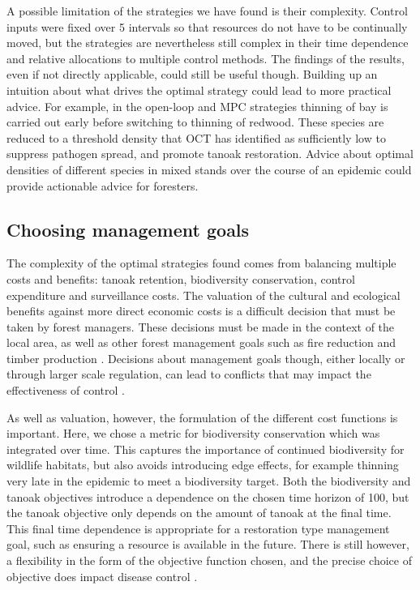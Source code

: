 A possible limitation of the strategies we have found is their complexity. Control inputs were fixed over \SI{5}{\year} intervals so that resources do not have to be continually moved, but the strategies are nevertheless still complex in their time dependence and relative allocations to multiple control methods. The findings of the results, even if not directly applicable, could still be useful though. Building up an intuition about what drives the optimal strategy could lead to more practical advice. For example, in the open-loop and MPC strategies thinning of bay is carried out early before switching to thinning of redwood. These species are reduced to a threshold density that OCT has identified as sufficiently low to suppress pathogen spread, and promote tanoak restoration. Advice about optimal densities of different species in mixed stands over the course of an epidemic could provide actionable advice for foresters.

\subsection{Choosing management goals}

The complexity of the optimal strategies found comes from balancing multiple costs and benefits: tanoak retention, biodiversity conservation, control expenditure and surveillance costs. The valuation of the cultural and ecological benefits against more direct economic costs is a difficult decision that must be taken by forest managers. These decisions must be made in the context of the local area, as well as other forest management goals such as fire reduction and timber production \citep{cobb_resiliency_2017}. Decisions about management goals though, either locally or through larger scale regulation, can lead to conflicts that may impact the effectiveness of control \citep{alexander_lessons_2010}.

As well as valuation, however, the formulation of the different cost functions is important. Here, we chose a metric for biodiversity conservation which was integrated over time. This captures the importance of continued biodiversity for wildlife habitats, but also avoids introducing edge effects, for example thinning very late in the epidemic to meet a biodiversity target. Both the biodiversity and tanoak objectives introduce a dependence on the chosen time horizon of \SI{100}{\years}, but the tanoak objective only depends on the amount of tanoak at the final time. This final time dependence is appropriate for a restoration type management goal, such as ensuring a resource is available in the future. There is still however, a flexibility in the form of the objective function chosen, and the precise choice of objective does impact disease control \citep{probert_decision_2016}.

